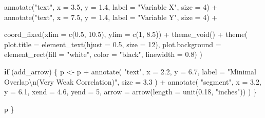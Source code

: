 \documentclass[
  letterpaper,
  DIV=11,
  numbers=noendperiod]{scrreprt}
\newenvironment{Shaded}{\begin{snugshade}}{\end{snugshade}}
\newcommand{\AttributeTok}[1]{\textcolor[rgb]{0.40,0.45,0.13}{#1}}
\newcommand{\ControlFlowTok}[1]{\textcolor[rgb]{0.00,0.23,0.31}{\textbf{#1}}}
\newcommand{\DecValTok}[1]{\textcolor[rgb]{0.68,0.00,0.00}{#1}}
\newcommand{\FloatTok}[1]{\textcolor[rgb]{0.68,0.00,0.00}{#1}}
\newcommand{\FunctionTok}[1]{\textcolor[rgb]{0.28,0.35,0.67}{#1}}
\newcommand{\NormalTok}[1]{\textcolor[rgb]{0.00,0.23,0.31}{#1}}
\newcommand{\OtherTok}[1]{\textcolor[rgb]{0.00,0.23,0.31}{#1}}
\newcommand{\SpecialCharTok}[1]{\textcolor[rgb]{0.37,0.37,0.37}{#1}}
\newcommand{\StringTok}[1]{\textcolor[rgb]{0.13,0.47,0.30}{#1}}
\begin{document}
\begin{Shaded}
\begin{Highlighting}[]
    \FunctionTok{annotate}\NormalTok{(}\StringTok{"text"}\NormalTok{, }\AttributeTok{x =} \FloatTok{3.5}\NormalTok{, }\AttributeTok{y =} \FloatTok{1.4}\NormalTok{, }\AttributeTok{label =} \StringTok{"Variable X"}\NormalTok{, }\AttributeTok{size =} \DecValTok{4}\NormalTok{) }\SpecialCharTok{+}
    \FunctionTok{annotate}\NormalTok{(}\StringTok{"text"}\NormalTok{, }\AttributeTok{x =} \FloatTok{7.5}\NormalTok{, }\AttributeTok{y =} \FloatTok{1.4}\NormalTok{, }\AttributeTok{label =} \StringTok{"Variable Y"}\NormalTok{, }\AttributeTok{size =} \DecValTok{4}\NormalTok{) }\SpecialCharTok{+}
    
    \FunctionTok{coord\_fixed}\NormalTok{(}\AttributeTok{xlim =} \FunctionTok{c}\NormalTok{(}\FloatTok{0.5}\NormalTok{, }\FloatTok{10.5}\NormalTok{), }\AttributeTok{ylim =} \FunctionTok{c}\NormalTok{(}\DecValTok{1}\NormalTok{, }\FloatTok{8.5}\NormalTok{)) }\SpecialCharTok{+}
    \FunctionTok{theme\_void}\NormalTok{() }\SpecialCharTok{+}
    \FunctionTok{theme}\NormalTok{(}
      \AttributeTok{plot.title =} \FunctionTok{element\_text}\NormalTok{(}\AttributeTok{hjust =} \FloatTok{0.5}\NormalTok{, }\AttributeTok{size =} \DecValTok{12}\NormalTok{),}
      \AttributeTok{plot.background =} \FunctionTok{element\_rect}\NormalTok{(}\AttributeTok{fill =} \StringTok{"white"}\NormalTok{, }\AttributeTok{color =} \StringTok{"black"}\NormalTok{, }\AttributeTok{linewidth =} \FloatTok{0.8}\NormalTok{)}
\NormalTok{    )}
  
  \ControlFlowTok{if}\NormalTok{ (add\_arrow) \{}
\NormalTok{    p }\OtherTok{\textless{}{-}}\NormalTok{ p }\SpecialCharTok{+}
      \FunctionTok{annotate}\NormalTok{(}
        \StringTok{"text"}\NormalTok{,}
        \AttributeTok{x =} \FloatTok{2.2}\NormalTok{, }\AttributeTok{y =} \FloatTok{6.7}\NormalTok{,}
        \AttributeTok{label =} \StringTok{"Minimal Overlap}\SpecialCharTok{\textbackslash{}n}\StringTok{(Very Weak Correlation)"}\NormalTok{,}
        \AttributeTok{size =} \FloatTok{3.3}
\NormalTok{      ) }\SpecialCharTok{+}
      \FunctionTok{annotate}\NormalTok{(}
        \StringTok{"segment"}\NormalTok{,}
        \AttributeTok{x =} \FloatTok{3.2}\NormalTok{, }\AttributeTok{y =} \FloatTok{6.1}\NormalTok{, }\AttributeTok{xend =} \FloatTok{4.6}\NormalTok{, }\AttributeTok{yend =} \DecValTok{5}\NormalTok{,}
        \AttributeTok{arrow =} \FunctionTok{arrow}\NormalTok{(}\AttributeTok{length =} \FunctionTok{unit}\NormalTok{(}\FloatTok{0.18}\NormalTok{, }\StringTok{"inches"}\NormalTok{))}
\NormalTok{      )}
\NormalTok{  \}}
  
\NormalTok{  p}
\NormalTok{\}}


\end{Highlighting}
\end{Shaded}
\end{document}
